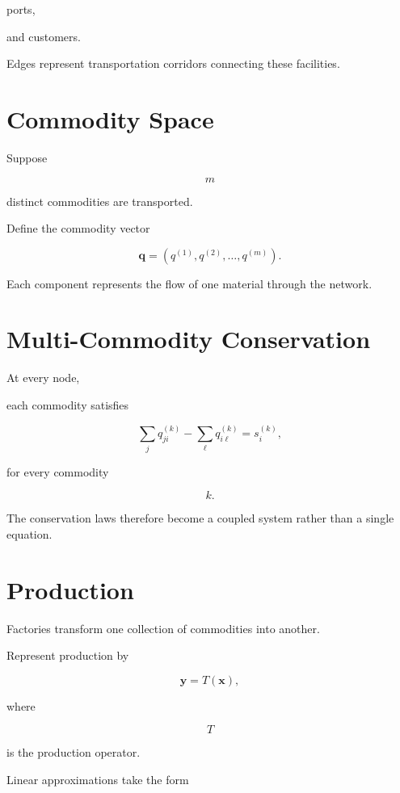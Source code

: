 \documentclass[11pt,fleqn]{book}
\numberwithin{equation}{chapter}
\theoremstyle{plain}
\theoremstyle{definition}
\theoremstyle{remark}
\begin{document}
ports,

and customers.

Edges represent transportation corridors connecting these facilities.


\section{Commodity Space}

Suppose

\[
m
\]

distinct commodities are transported.

Define the commodity vector

\[
\mathbf q
=
(q^{(1)},q^{(2)},\ldots,q^{(m)}).
\]

Each component represents the flow of one material through the network.


\section{Multi-Commodity Conservation}

At every node,

each commodity satisfies

\[
\boxed{
\sum_j
q_{ji}^{(k)}
-
\sum_\ell
q_{i\ell}^{(k)}
=
s_i^{(k)},
}
\]

for every commodity

\[
k.
\]

The conservation laws therefore become a coupled system rather than a
single equation.


\section{Production}

Factories transform one collection of commodities into another.

Represent production by

\[
\mathbf y
=
T(\mathbf x),
\]

where

\[
T
\]

is the production operator.

Linear approximations take the form
\end{document}
